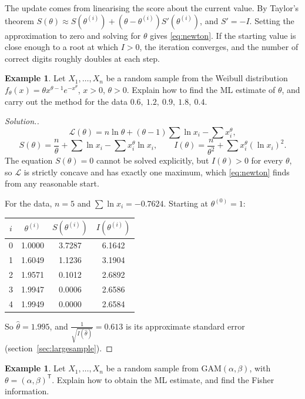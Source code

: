 \documentclass[12pt,a4paper]{report}
\theoremstyle{definition}
\newtheorem{exa}[thm]{Example}
\newenvironment{solution}
  {\renewcommand{\qedsymbol}{}\begin{proof}[\textit{Solution}.]}
  {\end{proof}}
\begin{document}
The update comes from linearising the score about the current value. By Taylor's
theorem $S(\theta)\approx S(\theta^{(i)}) + (\theta - \theta^{(i)})S'(\theta^{(i)})$,
and $S' = -I$. Setting the approximation to zero and solving for $\theta$ gives
\eqref{eq:newton}. If the starting value is close enough to a root at which $I>0$,
the iteration converges, and the number of correct digits roughly doubles at each
step.

\begin{exa}
\label{ex:weibullnewton}
Let $X_1, \dots, X_n$ be a random sample from the Weibull distribution
$f_\theta(x) = \theta x^{\theta - 1}e^{-x^\theta}$, $x>0$, $\theta>0$. Explain how to
find the ML estimate of $\theta$, and carry out the method for the data
$0.6,\ 1.2,\ 0.9,\ 1.8,\ 0.4$.
\end{exa}

\begin{solution}
\[\mathcal{L}(\theta) = n\ln\theta + (\theta - 1)\sum\ln x_i - \sum x_i^\theta ,\]
\[S(\theta) = \frac n\theta + \sum\ln x_i - \sum x_i^\theta\ln x_i,\qquad
I(\theta) = \frac{n}{\theta^2} + \sum x_i^\theta(\ln x_i)^2 .\]
The equation $S(\theta) = 0$ cannot be solved explicitly, but $I(\theta)>0$ for every
$\theta$, so $\mathcal{L}$ is strictly concave and has exactly one maximum, which
\eqref{eq:newton} finds from any reasonable start.

For the data, $n = 5$ and $\sum\ln x_i = -0.7624$. Starting at $\theta^{(0)} = 1$:
\begin{center}
\begin{tabular}{cccc}
$i$ & $\theta^{(i)}$ & $S(\theta^{(i)})$ & $I(\theta^{(i)})$\\
\hline
0 & 1.0000 & 3.7287 & 6.1642\\
1 & 1.6049 & 1.1236 & 3.1904\\
2 & 1.9571 & 0.1012 & 2.6892\\
3 & 1.9947 & 0.0006 & 2.6586\\
4 & 1.9949 & 0.0000 & 2.6584
\end{tabular}
\end{center}
So $\hat\theta = 1.995$, and $\frac{1}{\sqrt{I(\hat\theta)}} = 0.613$ is its approximate
standard error (section~\ref{sec:largesample}).
\end{solution}

\begin{exa}
\label{ex:gammamle}
Let $X_1, \dots, X_n$ be a random sample from $\text{GAM}(\alpha, \beta)$, with
$\theta = (\alpha, \beta)^{\mathsf T}$. Explain how to obtain the ML estimate, and
find the Fisher information.
\end{exa}
\end{document}
